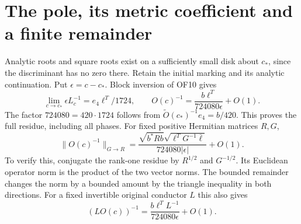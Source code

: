 \section{The pole, its metric coefficient and a finite remainder}
Analytic roots and square roots exist on a sufficiently small disk
about $c_*$, since the discriminant has no zero there. Retain the
initial marking and its analytic continuation. Put $\epsilon=c-c_*$.
Block inversion of OF10 gives
\begin{equation}
 \lim_{c\to c_*}\epsilon L_c^{-1}=e_4\ell^T/1724,
 \qquad
 O(c)^{-1}=\frac{b\ell^T}{724080\epsilon}+O(1).
 \tag{OF12}
\end{equation}
The factor $724080=420\cdot1724$ follows from
$\widetilde O(c_*)^{-1}e_4=b/420$. This proves the full residue,
including all phases. For fixed positive Hermitian matrices $R,G$,
\begin{equation}
 \|O(c)^{-1}\|_{G\to R}
 =\frac{\sqrt{b^*Rb}\sqrt{\ell^TG^{-1}\bar\ell}}
 {724080|\epsilon|}+O(1).\tag{OF13}
\end{equation}
To verify this, conjugate the rank-one residue by $R^{1/2}$ and
$G^{-1/2}$. Its Euclidean operator norm is the product of the
two vector norms. The bounded remainder changes the norm by a
bounded amount by the triangle inequality in both directions.
For a fixed invertible original conductor $L$ this also gives
\[
 (LO(c))^{-1}=\frac{b\ell^TL^{-1}}{724080\epsilon}+O(1).
\]

